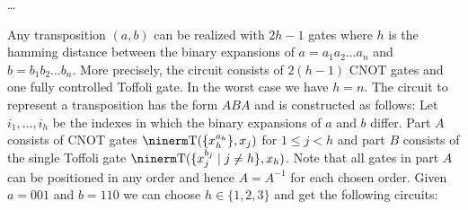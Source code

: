 \dots \qquad\slug









\medskip{}\enspace Any transposition $(a,b)$ can be
realized with $2h-1$ gates where $h$ is the hamming distance between the binary
expansions of $a=a_1a_2\dots a_n$ and $b=b_1b_2\dots b_n$.  More precisely, the
circuit consists of $2(h-1)$ CNOT gates and one fully controlled Toffoli gate.
In the worst case we have $h=n$.  The circuit to represent a transposition has
the form $ABA$ and is constructed as follows: Let $i_1,\dots,i_h$ be the indexes
in which the binary expansions of $a$ and $b$ differ.  Part $A$ consists of CNOT
gates ${\rm T}(\{x_h^{a_h}\}, x_j)$ for $1\le j< h$ and part $B$ consists of the
single Toffoli gate ${\rm T}(\{x_j^{b_j}\mid j\neq h\}, x_h)$.  Note that all
gates in part $A$ can be positioned in any order and hence $A=A^{-1}$ for each
chosen order.  Given $a=001$ and $b=110$ we can choose $h \in \{1,2,3\}$ and get
the following circuits:

